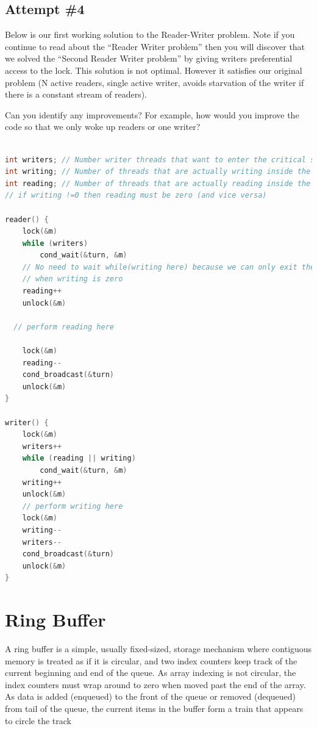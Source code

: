 \subsection{Attempt \#4}\label{attempt-4}

Below is our first working solution to the Reader-Writer problem. Note if you continue to read about the ``Reader Writer problem'' then you will discover that we solved the ``Second Reader Writer problem'' by giving writers preferential access to the lock. This solution is not optimal. However it satisfies our original problem (N active readers, single active writer, avoids starvation of the writer if there is a constant stream of readers).

Can you identify any improvements? For example, how would you improve the code so that we only woke up readers or one writer?

\begin{lstlisting}[language=C]

int writers; // Number writer threads that want to enter the critical section (some or all of these may be blocked)
int writing; // Number of threads that are actually writing inside the C.S. (can only be zero or one)
int reading; // Number of threads that are actually reading inside the C.S.
// if writing !=0 then reading must be zero (and vice versa)

reader() {
    lock(&m)
    while (writers)
        cond_wait(&turn, &m)
    // No need to wait while(writing here) because we can only exit the above loop
    // when writing is zero
    reading++
    unlock(&m)

  // perform reading here

    lock(&m)
    reading--
    cond_broadcast(&turn)
    unlock(&m)
}

writer() {
    lock(&m)  
    writers++  
    while (reading || writing)   
        cond_wait(&turn, &m)  
    writing++  
    unlock(&m)  
    // perform writing here  
    lock(&m)  
    writing--  
    writers--  
    cond_broadcast(&turn)  
    unlock(&m)  
}
\end{lstlisting}

\section{Ring Buffer}\label{Ring Buffer}

A ring buffer is a simple, usually fixed-sized, storage mechanism where contiguous memory is treated as if it is circular, and two index counters keep track of the current beginning and end of the queue. As array indexing is not circular, the index counters must wrap around to zero when moved past the end of the array. As data is added (enqueued) to the front of the queue or removed (dequeued) from tail of the queue, the current items in the buffer form a train that appears to circle the track 

